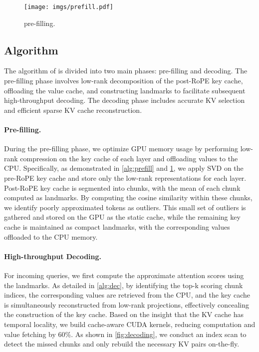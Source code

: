 \begin{figure}[t]
\begin{minipage}{0.57\linewidth}
\begin{algorithm}[H]
\begin{algorithmic}
\end{algorithmic}
\end{algorithm}
\end{minipage}
\hfill
\begin{minipage}[c]{0.41\linewidth}
\centering
\texttt{[image: imgs/prefill.pdf]}
\caption{\Sys pre-filling.}
\label{fig:prefill}
\end{minipage}
\end{figure}

\subsection{Algorithm}
\label{algo}
The algorithm of \Sys is divided into two main phases: pre-filling and decoding. The pre-filling phase involves low-rank decomposition of the post-RoPE key cache, offloading the value cache, and constructing landmarks to facilitate subsequent high-throughput decoding. The decoding phase includes accurate KV selection and efficient sparse KV cache reconstruction.

\paragraph{Pre-filling.} During the pre-filling phase, we optimize GPU memory usage by performing low-rank compression on the key cache of each layer and offloading values to the CPU. Specifically, as demonstrated in \cref{alg:prefill} and \cref{fig:prefill}, we apply SVD on the pre-RoPE key cache and store only the low-rank representations for each layer. Post-RoPE key cache is segmented into chunks, with the mean of each chunk computed as landmarks. By computing the cosine similarity within these chunks, we identify poorly approximated tokens as outliers. This small set of outliers is gathered and stored on the GPU as the static cache, while the remaining key cache is maintained as compact landmarks, with the corresponding values offloaded to the CPU memory.

\paragraph{High-throughput Decoding.} For incoming queries, we first compute the approximate attention scores using the landmarks. As detailed in \cref{alg:dec}, by identifying the top-k scoring chunk indices, the corresponding values are retrieved from the CPU, and the key cache is simultaneously reconstructed from low-rank projections, effectively concealing the construction of the key cache. Based on the insight that the KV cache has temporal locality, we build cache-aware CUDA kernels, reducing computation and value fetching by 60\%. As shown in \cref{fig:decoding}, we conduct an index scan to detect the missed chunks and only rebuild the necessary KV pairs on-the-fly.

